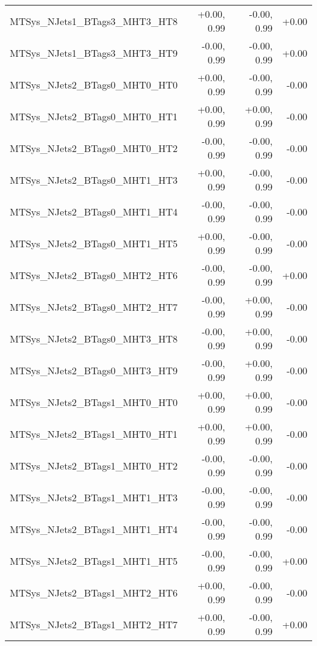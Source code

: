 \begin{tabular}{|l|r|r|r|}
MTSys\_NJets1\_BTags3\_MHT3\_HT8         &      +0.00, 0.99 &     -0.00, 0.99 &  +0.00 \\
MTSys\_NJets1\_BTags3\_MHT3\_HT9         &      -0.00, 0.99 &     -0.00, 0.99 &  +0.00 \\
MTSys\_NJets2\_BTags0\_MHT0\_HT0         &      +0.00, 0.99 &     -0.00, 0.99 &  -0.00 \\
MTSys\_NJets2\_BTags0\_MHT0\_HT1         &      +0.00, 0.99 &     +0.00, 0.99 &  -0.00 \\
MTSys\_NJets2\_BTags0\_MHT0\_HT2         &      -0.00, 0.99 &     -0.00, 0.99 &  -0.00 \\
MTSys\_NJets2\_BTags0\_MHT1\_HT3         &      +0.00, 0.99 &     -0.00, 0.99 &  -0.00 \\
MTSys\_NJets2\_BTags0\_MHT1\_HT4         &      -0.00, 0.99 &     -0.00, 0.99 &  -0.00 \\
MTSys\_NJets2\_BTags0\_MHT1\_HT5         &      +0.00, 0.99 &     -0.00, 0.99 &  -0.00 \\
MTSys\_NJets2\_BTags0\_MHT2\_HT6         &      -0.00, 0.99 &     -0.00, 0.99 &  +0.00 \\
MTSys\_NJets2\_BTags0\_MHT2\_HT7         &      -0.00, 0.99 &     +0.00, 0.99 &  -0.00 \\
MTSys\_NJets2\_BTags0\_MHT3\_HT8         &      -0.00, 0.99 &     +0.00, 0.99 &  -0.00 \\
MTSys\_NJets2\_BTags0\_MHT3\_HT9         &      -0.00, 0.99 &     +0.00, 0.99 &  -0.00 \\
MTSys\_NJets2\_BTags1\_MHT0\_HT0         &      +0.00, 0.99 &     +0.00, 0.99 &  -0.00 \\
MTSys\_NJets2\_BTags1\_MHT0\_HT1         &      +0.00, 0.99 &     +0.00, 0.99 &  -0.00 \\
MTSys\_NJets2\_BTags1\_MHT0\_HT2         &      -0.00, 0.99 &     -0.00, 0.99 &  -0.00 \\
MTSys\_NJets2\_BTags1\_MHT1\_HT3         &      -0.00, 0.99 &     -0.00, 0.99 &  -0.00 \\
MTSys\_NJets2\_BTags1\_MHT1\_HT4         &      -0.00, 0.99 &     -0.00, 0.99 &  -0.00 \\
MTSys\_NJets2\_BTags1\_MHT1\_HT5         &      -0.00, 0.99 &     -0.00, 0.99 &  +0.00 \\
MTSys\_NJets2\_BTags1\_MHT2\_HT6         &      +0.00, 0.99 &     -0.00, 0.99 &  -0.00 \\
MTSys\_NJets2\_BTags1\_MHT2\_HT7         &      +0.00, 0.99 &     -0.00, 0.99 &  +0.00 \\

\end{tabular}

